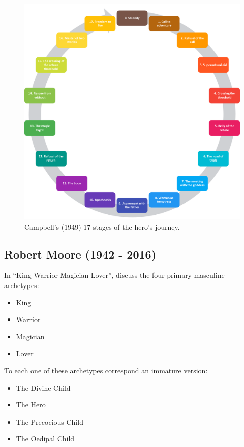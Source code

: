 \documentclass[
]{book}
\providecommand{\tightlist}{%
  \setlength{\itemsep}{0pt}\setlength{\parskip}{0pt}}
\begin{document}
\begin{figure}

{\centering \includegraphics[width=\textwidth]{img/monomyth} 

}

\caption{Campbell's (1949) 17 stages of the hero's journey.}\label{fig:unnamed-chunk-8}
\end{figure}

\hypertarget{robert-moore-1942---2016}{%
\subsection{Robert Moore (1942 - 2016)}\label{robert-moore-1942---2016}}

In ``King Warrior Magician Lover'', \citet{moore1991king} discuss the four primary masculine archetypes:

\begin{itemize}
\tightlist
\item
  King
\item
  Warrior
\item
  Magician
\item
  Lover
\end{itemize}

To each one of these archetypes correspond an immature version:

\begin{itemize}
\tightlist
\item
  The Divine Child
\item
  The Hero
\item
  The Precocious Child
\item
  The Oedipal Child
\end{itemize}
\end{document}
